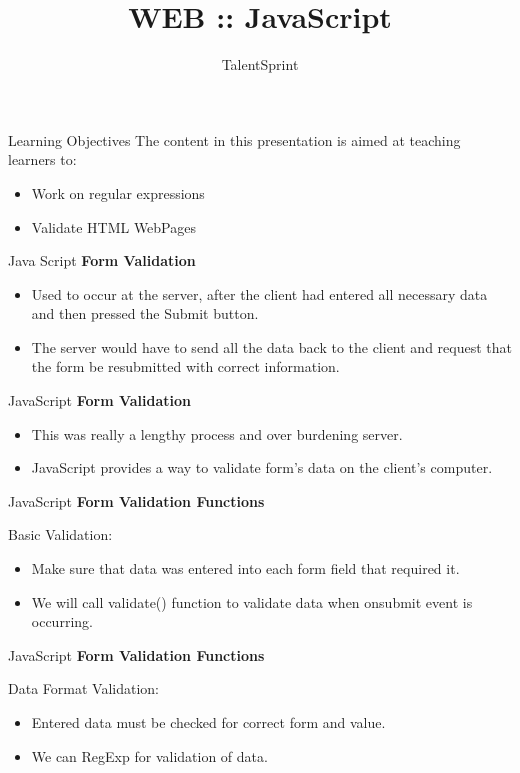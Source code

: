 \documentclass[14pt]{beamer}
\title{WEB :: JavaScript}
\author[TS]{TalentSprint}
\institute[L\&D]{Licensed To Skill}
\begin{document}
\begin{frame}
  \titlepage
\end{frame}

\begin{frame}{Learning Objectives}
The content in this presentation is aimed at teaching  learners to:
  \begin{itemize}
  \item Work on regular expressions
  \item Validate HTML WebPages
  \end{itemize}
\end{frame}

\begin{frame}{Java Script}
\textbf{Form Validation}
\begin{itemize}
 \item Used to occur at the server, after the client had entered all necessary data and then pressed the Submit button.
 \item The server would have to send all the data back to the client and request that the form be resubmitted with correct information. 
\end{itemize}
\end{frame}

\begin{frame}{JavaScript}
\textbf{Form Validation}
\begin{itemize}
 \item This was really a lengthy process and over burdening server. 
 \item JavaScript provides a way to validate form's data on the client's computer.
\end{itemize}
\end{frame}

\begin{frame}{JavaScript}
\textbf{Form Validation Functions}

\vspace{1pc}
Basic Validation:
\begin{itemize}
 \item Make sure that data was entered into each form field that required it.
 \item We will call validate() function to validate data when onsubmit event is occurring.
\end{itemize}
\end{frame}

\begin{frame}{JavaScript}
\textbf{Form Validation Functions}

\vspace{1pc}
Data Format Validation:
\begin{itemize}
 \item Entered data must be checked for correct form and value.
 \item We can RegExp for validation of data.
\end{itemize}
\end{frame}
\end{document}
